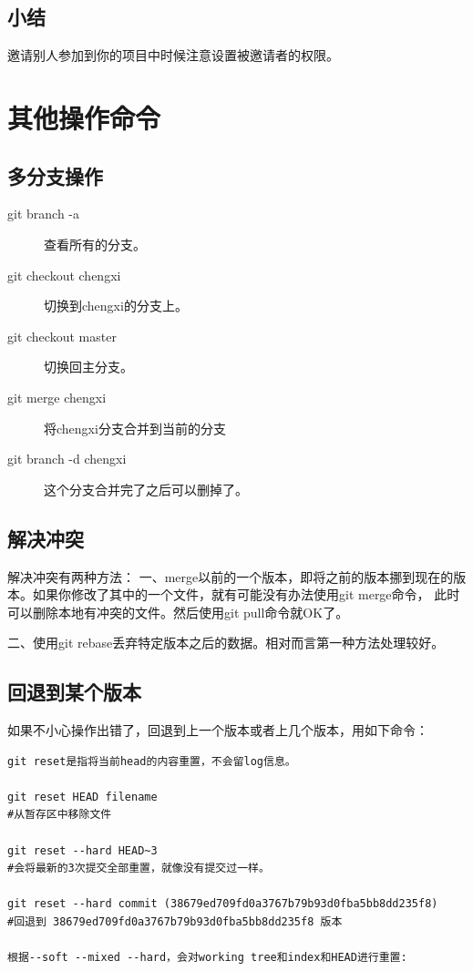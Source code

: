 \documentclass[a4paper,12pt]{ctexbook}
\begin{document}
\begin{flushleft}
\section{小结}
邀请别人参加到你的项目中时候注意设置被邀请者的权限。


\chapter{其他操作命令}
\section{多分支操作}
\begin{description}
  \item[git branch -a] 查看所有的分支。
  \item[git checkout chengxi] 切换到chengxi的分支上。
  \item[git checkout master] 切换回主分支。
  \item[git merge chengxi] 将chengxi分支合并到当前的分支
  \item[git branch -d chengxi] 这个分支合并完了之后可以删掉了。
\end{description}

\section{解决冲突}
解决冲突有两种方法：
一、merge以前的一个版本，即将之前的版本挪到现在的版本。如果你修改了其中的一个文件，就有可能没有办法使用git merge命令，
此时可以删除本地有冲突的文件。然后使用git pull命令就OK了。

二、使用git rebase丢弃特定版本之后的数据。相对而言第一种方法处理较好。

\section{回退到某个版本}
如果不小心操作出错了，回退到上一个版本或者上几个版本，用如下命令：
\begin{verbatim}
git reset是指将当前head的内容重置，不会留log信息。

git reset HEAD filename
#从暂存区中移除文件

git reset --hard HEAD~3
#会将最新的3次提交全部重置，就像没有提交过一样。

git reset --hard commit (38679ed709fd0a3767b79b93d0fba5bb8dd235f8)
#回退到 38679ed709fd0a3767b79b93d0fba5bb8dd235f8 版本

根据--soft --mixed --hard，会对working tree和index和HEAD进行重置:


\end{verbatim}
\end{flushleft}
\end{document}
